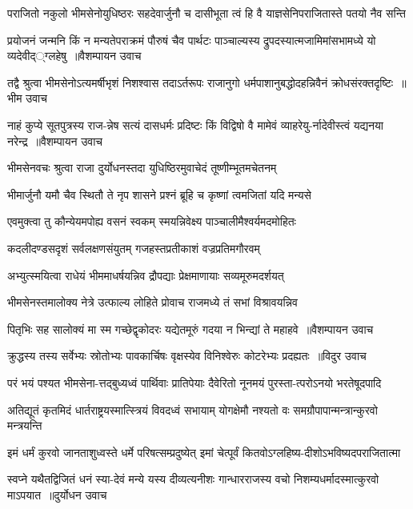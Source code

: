 \twolineshloka
{पराजितो नकुलो भीमसेनोयुधिष्ठरः सहदेवार्जुनौ च}
{दासीभूता त्वं हि वै याज्ञसेनिपराजितास्ते पतयो नैव सन्ति}


\twolineshloka
{प्रयोजनं जन्मनि किं न मन्यतेपराक्रमं पौरुषं चैव पार्थटः}
{पाञ्चाल्यस्य द्रुपदस्यात्मजामिमांसभामध्ये यो व्यदेवीद््ग्लहेषु ॥वैशम्पायन उवाच}


\twolineshloka
{तद्वै श्रुत्वा भीमसेनोऽत्यमर्षीभृशं निशश्वास तदाऽर्तरूपः}
{राजानुगो धर्मपाशानुबद्धोदहन्निवैनं क्रोधसंरक्तदृष्टिः ॥भीम उवाच}


\twolineshloka
{नाहं कुप्ये सूतपुत्रस्य राज-न्नेष सत्यं दासधर्मः प्रदिष्टः}
{किं विद्विषो वै मामेवं व्याहरेयु-र्नादेवीस्त्वं यद्यनया नरेन्द्र ॥वैशम्पायन उवाच}


\twolineshloka
{भीमसेनवचः श्रुत्वा राजा दुर्योधनस्तदा}
{युधिष्ठिरमुवाचेदं तूष्णीम्भूतमचेतनम्}


\twolineshloka
{भीमार्जुनौ यमौ चैव स्थितौ ते नृप शासने}
{प्रश्नं ब्रूहि च कृष्णां त्वमजितां यदि मन्यसे}


\twolineshloka
{एवमुक्त्वा तु कौन्येयमपोह्य वसनं स्वकम्}
{स्मयन्निवेक्ष्य पाञ्चालीमैश्वर्यमदमोहितः}


\twolineshloka
{कदलीदण्डसदृशं सर्वलक्षणसंयुतम्}
{गजहस्तप्रतीकाशं वज्रप्रतिमगौरवम्}


\twolineshloka
{अभ्युत्स्मयित्वा राधेयं भीममाधर्षयन्निव}
{द्रौपद्याः प्रेक्षमाणायाः सव्यमूरुमदर्शयत्}


\twolineshloka
{भीमसेनस्तमालोक्य नेत्रे उत्फाल्य लोहिते}
{प्रोवाच राजमध्ये तं सभां विश्रावयन्निव}


\twolineshloka
{पितृभिः सह सालोक्यं मा स्म गच्छेद्वृकोदरः}
{यद्येतमूरुं गदया न भिन्द्यां ते महाहवे ॥वैशम्पायन उवाच}


\twolineshloka
{क्रुद्धस्य तस्य सर्वेभ्यः स्रोतोभ्यः पावकार्चिषः}
{वृक्षस्येव विनिश्वेरुः कोटरेभ्यः प्रदह्यतः ॥विदुर उवाच}


\twolineshloka
{परं भयं पश्यत भीमसेना-त्तद्बुध्यध्वं पार्थिवाः प्रातिपेयाः}
{दैवेरितो नूनमयं पुरस्ता-त्परोऽनयो भरतेषूदपादि}


\twolineshloka
{अतिद्यूतं कृतमिदं धार्तराष्ट्रयस्मात्स्त्रियं विवदध्वं सभायाम्}
{योगक्षेमौ नश्यतो वः समग्रौपापान्मन्त्रान्कुरवो मन्त्रयन्ति}


\twolineshloka
{इमं धर्मं कुरवो जानताशुध्वस्ते धर्मे परिषत्सम्प्रदुष्येत्}
{इमां चेत्पूर्वं कितवोऽग्लहिष्य-दीशोऽभविष्यदपराजितात्मा}


\twolineshloka
{स्वप्ने यथैतद्विजितं धनं स्या-देवं मन्ये यस्य दीव्यत्यनीशः}
{गान्धारराजस्य वचो निशम्यधर्मादस्मात्कुरवो माऽपयात ॥दुर्योधन उवाच}


